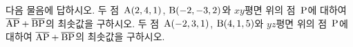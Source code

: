 다음 물음에 답하시오.
 두 점~$\mathrm{A}(2{,}\mkern3mu\mathopen{}4{,}\mkern3mu\mathopen{}1)$, $\mathrm{B}(-2{,}\mkern3mu\mathopen{}-3{,}\mkern3mu\mathopen{}2)$와 $xy$평면 위의 점~$\mathrm{P}$에 대하여 $\overline{\mathrm{AP}}+\overline{\mathrm{BP}}$의 최솟값을 구하시오.
 두 점~$\mathrm{A}(-2{,}\mkern3mu\mathopen{}3{,}\mkern3mu\mathopen{}1)$, $\mathrm{B}(4{,}\mkern3mu\mathopen{}1{,}\mkern3mu\mathopen{}5)$와 $yz$평면 위의 점~$\mathrm{P}$에 대하여 $\overline{\mathrm{AP}}+\overline{\mathrm{BP}}$의 최솟값을 구하시오.
